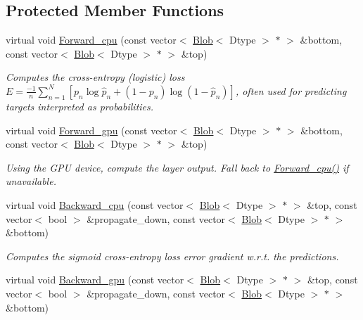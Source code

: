 \subsection*{Protected Member Functions}
\begin{DoxyCompactItemize}
\item 
virtual void \hyperlink{classcaffe_1_1SigmoidCrossEntropyLossLayer_a222746c19788807b94137bbe722033e3}{Forward\+\_\+cpu} (const vector$<$ \hyperlink{classcaffe_1_1Blob}{Blob}$<$ Dtype $>$ $\ast$ $>$ \&bottom, const vector$<$ \hyperlink{classcaffe_1_1Blob}{Blob}$<$ Dtype $>$ $\ast$ $>$ \&top)
\begin{DoxyCompactList}\small\item\em Computes the cross-\/entropy (logistic) loss $ E = \frac{-1}{n} \sum\limits_{n=1}^N \left[ p_n \log \hat{p}_n + (1 - p_n) \log(1 - \hat{p}_n) \right] $, often used for predicting targets interpreted as probabilities. \end{DoxyCompactList}\item 
virtual void \hyperlink{classcaffe_1_1SigmoidCrossEntropyLossLayer_afc33199fe9526b4bec94bb8cab02dd9f}{Forward\+\_\+gpu} (const vector$<$ \hyperlink{classcaffe_1_1Blob}{Blob}$<$ Dtype $>$ $\ast$ $>$ \&bottom, const vector$<$ \hyperlink{classcaffe_1_1Blob}{Blob}$<$ Dtype $>$ $\ast$ $>$ \&top)\hypertarget{classcaffe_1_1SigmoidCrossEntropyLossLayer_afc33199fe9526b4bec94bb8cab02dd9f}{}\label{classcaffe_1_1SigmoidCrossEntropyLossLayer_afc33199fe9526b4bec94bb8cab02dd9f}

\begin{DoxyCompactList}\small\item\em Using the G\+PU device, compute the layer output. Fall back to \hyperlink{classcaffe_1_1SigmoidCrossEntropyLossLayer_a222746c19788807b94137bbe722033e3}{Forward\+\_\+cpu()} if unavailable. \end{DoxyCompactList}\item 
virtual void \hyperlink{classcaffe_1_1SigmoidCrossEntropyLossLayer_a66ca156e1b45f62b0cd2f450ce7af7ec}{Backward\+\_\+cpu} (const vector$<$ \hyperlink{classcaffe_1_1Blob}{Blob}$<$ Dtype $>$ $\ast$ $>$ \&top, const vector$<$ bool $>$ \&propagate\+\_\+down, const vector$<$ \hyperlink{classcaffe_1_1Blob}{Blob}$<$ Dtype $>$ $\ast$ $>$ \&bottom)
\begin{DoxyCompactList}\small\item\em Computes the sigmoid cross-\/entropy loss error gradient w.\+r.\+t. the predictions. \end{DoxyCompactList}\item 
virtual void \hyperlink{classcaffe_1_1SigmoidCrossEntropyLossLayer_a4ab248879403db02c7c1493f6025eb2e}{Backward\+\_\+gpu} (const vector$<$ \hyperlink{classcaffe_1_1Blob}{Blob}$<$ Dtype $>$ $\ast$ $>$ \&top, const vector$<$ bool $>$ \&propagate\+\_\+down, const vector$<$ \hyperlink{classcaffe_1_1Blob}{Blob}$<$ Dtype $>$ $\ast$ $>$ \&bottom)\hypertarget{classcaffe_1_1SigmoidCrossEntropyLossLayer_a4ab248879403db02c7c1493f6025eb2e}{}\label{classcaffe_1_1SigmoidCrossEntropyLossLayer_a4ab248879403db02c7c1493f6025eb2e}


\end{DoxyCompactItemize}
